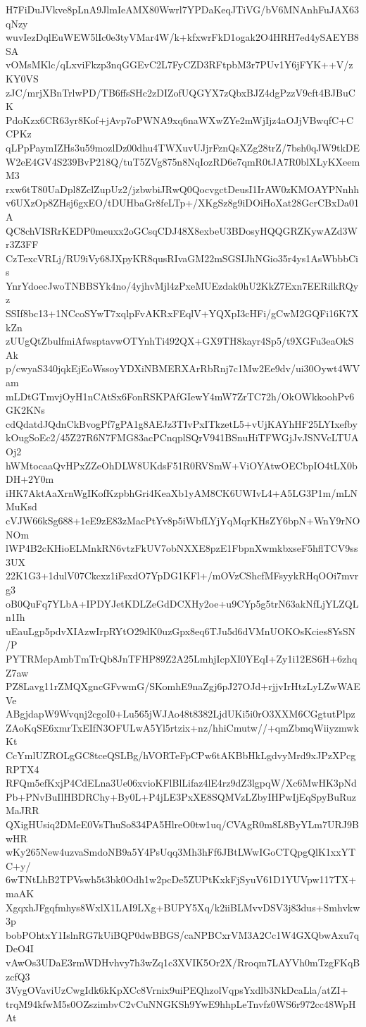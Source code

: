 H7FiDuJVkve8pLnA9JlmIeAMX80Wwrl7YPDaKeqJTiVG/bV6MNAnhFuJAX63qNzy
wuvIezDqlEuWEW5lIc0e3tyVMar4W/k+kfxwrFkD1ogak2O4HRH7ed4ySAEYB8SA
vOMsMKlc/qLxviFkzp3nqGGEvC2L7FyCZD3RFtpbM3r7PUv1Y6jFYK++V/zKY0VS
zJC/mrjXBnTrlwPD/TB6ffsSHc2zDIZofUQGYX7zQbxBJZ4dgPzzV9cft4BJBuCK
PdoKzx6CR63yr8Kof+jAvp7oPWNA9xq6naWXwZYe2mWjIjz4aOJjVBwqfC+CCPKz
qLPpPaymIZHs3u59mozlDz00dhu4TWXuvUJjrFznQsXZg28trZ/7bsh0qJW9tkDE
W2eE4GV4S239BvP218Q/tuT5ZVg875n8NqIozRD6e7qmR0tJA7R0blXLyKXeemM3
rxw6tT80UaDpl8ZclZupUz2/jzbwbiJRwQ0QocvgctDeusI1IrAW0zKMOAYPNnhh
v6UXzOp8ZHsj6gxEO/tDUHbaGr8feLTp+/XKgSz8g9iDOiHoXat28GcrCBxDa01A
QC8chVISRrKEDP0meuxx2oGCsqCDJ48X8exbeU3BDosyHQQGRZKywAZd3Wr3Z3FF
CzTexcVRLj/RU9iVy68JXpyKR8qusRIvaGM22mSGSIJhNGio35r4ys1AsWbbbCis
YnrYdoecJwoTNBBSYk4no/4yjhvMjl4zPxeMUEzdak0hU2KkZ7Exn7EERilkRQyz
SSIf8bc13+1NCcoSYwT7xqlpFvAKRxFEqlV+YQXpI3cHFi/gCwM2GQFi16K7XkZn
zUUgQtZbulfmiAfwsptavwOTYnhTi492QX+GX9TH8kayr4Sp5/t9XGFu3eaOkSAk
p/cwyaS340jqkEjEoWssoyYDXiNBMERXArRbRnj7c1Mw2Ee9dv/ui30Oywt4WVam
mLDtGTmvjOyH1nCAtSx6FonRSKPAfGIewY4mW7ZrTC72h/OkOWkkoohPv6GK2KNs
cdQdatdJQdnCkBvogPf7gPA1g8AEJz3TIvPxITkzetL5+vUjKAYhHF25LYIxefby
kOugSoEc2/45Z27R6N7FMG83acPCnqplSQrV941BSnuHiTFWGjJvJSNVcLTUAOj2
hWMtocaaQvHPxZZeOhDLW8UKdsF51R0RVSmW+ViOYAtwOECbpIO4tLX0bDH+2Y0m
iHK7AktAaXrnWgIKofKzpbhGri4KeaXb1yAM8CK6UWIvL4+A5LG3P1m/mLNMuKsd
cVJW66kSg688+1eE9zE83zMacPtYv8p5iWbfLYjYqMqrKHsZY6bpN+WnY9rNONOm
lWP4B2cKHioELMnkRN6vtzFkUV7obNXXE8pzE1FbpnXwmkbxseF5hflTCV9ss3UX
22K1G3+1dulV07Ckcxz1iFsxdO7YpDG1KFl+/mOVzCShcfMFsyykRHqOOi7mvrg3
oB0QuFq7YLbA+IPDYJetKDLZeGdDCXHy2oe+u9CYp5g5trN63akNfLjYLZQLn1Ih
uEauLgp5pdvXIAzwIrpRYtO29dK0uzGpx8eq6TJu5d6dVMnUOKOsKcies8YsSN/P
PYTRMepAmbTmTrQb8JnTFHP89Z2A25LmhjIcpXI0YEqI+Zy1i12ES6H+6zhqZ7aw
PZ8Lavg11rZMQXgncGFvwmG/SKomhE9naZgj6pJ27OJd+rjjvIrHtzLyLZwWAEVe
ABgjdapW9Wvqnj2cgoI0+Lu565jWJAo48t8382LjdUKi5i0rO3XXM6CGgtutPlpz
ZAoKqSE6xmrTxEIfN3OFULwA5Yl5rtzix+nz/hhiCmutw//+qmZbmqWiiyzmwkKt
CcYmlUZROLgGC8tceQSLBg/hVORTeFpCPw6tAKBbHkLgdvyMrd9xJPzXPcgRPTX4
RFQm5efKxjP4CdELna3Ue06xvioKFlBlLifaz4lE4rz9dZ3lgpqW/Xc6MwHK3pNd
Pb+PNvBuIlHBDRChy+By0L+P4jLE3PxXE8SQMVzLZbyIHPwIjEqSpyBuRuzMaJRR
QXigHUsiq2DMeE0VsThuSo834PA5HlreO0tw1uq/CVAgR0m8L8ByYLm7URJ9BwHR
wKy265New4uzvaSmdoNB9a5Y4PsUqq3Mh3hFf6JBtLWwIGoCTQpgQlK1xxYTC+y/
6wTNtLhB2TPVswh5t3bk0Odh1w2pcDe5ZUPtKxkFjSyuV61D1YUVpw117TX+maAK
XgqxhJFgqfmhys8WxlX1LAI9LXg+BUPY5Xq/k2iiBLMvvDSV3j83dus+Smhvkw3p
bobPOhtxY1IslnRG7kUiBQP0dwBBGS/caNPBCxrVM3A2Cc1W4GXQbwAxu7qDeO4I
vAwOs3UDaE3rmWDHvhvy7h3wZq1c3XVIK5Or2X/Rroqm7LAYVh0mTzgFKqBzcfQ3
3VygOVaviUzCwgIdk6kKpXCc8Vrnix9uiPEQhzolVqpsYxdlb3NkDcaLla/atZI+
trqM94kfwM5s0OZszimbvC2vCuNNGKSh9YwE9hhpLeTnvfz0WS6r972cc48WpHAt
